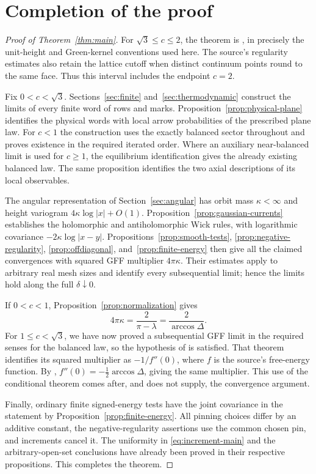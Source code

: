 \section{Completion of the proof}

\begin{proof}[Proof of Theorem~\ref{thm:main}]
For \(\sqrt3\le c\le2\), the theorem is
\cite[Theorem~2.8, with Definitions~2.6--2.7]{DKLM2026}, in precisely the
unit-height and Green-kernel conventions used here. The source's
regularity estimates also retain the lattice cutoff when distinct
continuum points round to the same face. Thus this interval includes
the endpoint \(c=2\).

Fix \(0<c<\sqrt3\). Sections~\ref{sec:finite}
and~\ref{sec:thermodynamic} construct the limits of every finite word
of rows and marks. Proposition~\ref{prop:physical-plane} identifies the
physical words with local arrow probabilities of the prescribed plane
law. For \(c<1\) the construction uses the exactly balanced sector
throughout and proves existence in the required iterated order. Where
an auxiliary near-balanced limit is used for \(c\ge1\), the equilibrium
identification gives the already existing balanced law. The same
proposition identifies the two axial descriptions of its local
observables.

The angular representation of Section~\ref{sec:angular} has orbit mass
\(\kappa<\infty\) and height variogram
\(4\kappa\log|x|+O(1)\). Proposition~\ref{prop:gaussian-currents}
establishes the holomorphic and antiholomorphic Wick rules, with
logarithmic covariance \(-2\kappa\log|x-y|\).
Propositions~\ref{prop:smooth-tests}, \ref{prop:negative-regularity},
\ref{prop:offdiagonal}, and~\ref{prop:finite-energy} then give all the
claimed convergences with squared GFF multiplier \(4\pi\kappa\).
Their estimates apply to arbitrary real mesh sizes and identify every
subsequential limit; hence the limits hold along the full
\(\delta\downarrow0\).

If \(0<c<1\), Proposition~\ref{prop:normalization} gives
\[
 4\pi\kappa=\frac2{\pi-\lambda}=\frac2{\arccos\Delta}.
\]
For \(1\le c<\sqrt3\), we have now proved a subsequential GFF limit in
the required senses for the balanced law, so the hypothesis of
\cite[Theorem~4.3]{DKLM2026} is satisfied. That theorem identifies its
squared multiplier as \(-1/f''(0)\), where \(f\) is the source's
free-energy function. By \cite[Theorem~4.4]{DKLM2026},
\(f''(0)=-\tfrac12\arccos\Delta\), giving the same multiplier.
This use of the conditional theorem comes after, and does not supply,
the convergence argument.

Finally, ordinary finite signed-energy tests have the joint covariance
in the statement by Proposition~\ref{prop:finite-energy}. All pinning
choices differ by an additive constant, the negative-regularity assertions
use the common chosen pin, and increments cancel it. The uniformity in
\eqref{eq:increment-main} and the arbitrary-open-set conclusions have
already been proved in their respective propositions. This completes
the theorem.
\end{proof}
